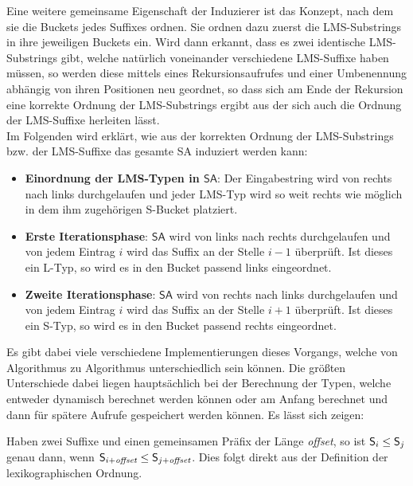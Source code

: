 Eine weitere gemeinsame Eigenschaft der Induzierer ist das Konzept, nach dem sie die Buckets jedes Suffixes ordnen. Sie ordnen dazu zuerst die LMS-Substrings in ihre jeweiligen Buckets ein. Wird dann erkannt, dass es zwei identische LMS-Substrings gibt, welche natürlich voneinander verschiedene LMS-Suffixe haben müssen, so werden diese mittels eines Rekursionsaufrufes und einer Umbenennung abhängig von ihren Positionen neu geordnet, so dass sich am Ende der Rekursion eine korrekte Ordnung der LMS-Substrings ergibt aus der sich auch die Ordnung der LMS-Suffixe herleiten lässt. \\
Im Folgenden wird erklärt, wie aus der korrekten Ordnung der LMS-Substrings bzw. der LMS-Suffixe das gesamte SA induziert werden kann:
\begin{itemize}
\item \textbf{Einordnung der LMS-Typen in $\mathsf{SA}$}: Der Eingabestring wird von rechts nach links durchgelaufen und jeder LMS-Typ wird so weit rechts wie möglich in dem ihm zugehörigen S-Bucket platziert.
\item \textbf{Erste Iterationsphase}: $\mathsf{SA}$ wird von links nach rechts durchgelaufen und von jedem Eintrag $i$ wird das Suffix an der Stelle $i-1$ überprüft. Ist dieses ein L-Typ, so wird es in den Bucket passend links eingeordnet.
\item \textbf{Zweite Iterationsphase}: $\mathsf{SA}$ wird von rechts nach links durchgelaufen und von jedem Eintrag $i$ wird das Suffix an der Stelle $i+1$ überprüft. Ist dieses ein S-Typ, so wird es in den Bucket passend rechts eingeordnet.
\end{itemize}

Es gibt dabei viele verschiedene Implementierungen dieses Vorgangs, welche von Algorithmus zu Algorithmus unterschiedlich sein können. Die größten Unterschiede dabei liegen hauptsächlich bei der Berechnung der Typen, welche entweder dynamisch berechnet werden können oder am Anfang berechnet und dann für spätere Aufrufe gespeichert werden können. Es lässt sich zeigen:

\begin{lemma}
	\label{lemma:common_prefix}
	\normalfont
    Haben zwei Suffixe  und  einen gemeinsamen Präfix der Länge {\textit{offset}\xspace}, so ist \(\mathsf{S}_{i} \leq \mathsf{S}_{j}\) genau dann, wenn \(\mathsf{S}_{i+{\textit{offset}}} \leq \mathsf{S}_{j+{\textit{offset}}}\). Dies folgt direkt aus der Definition der lexikographischen Ordnung.
\end{lemma}
